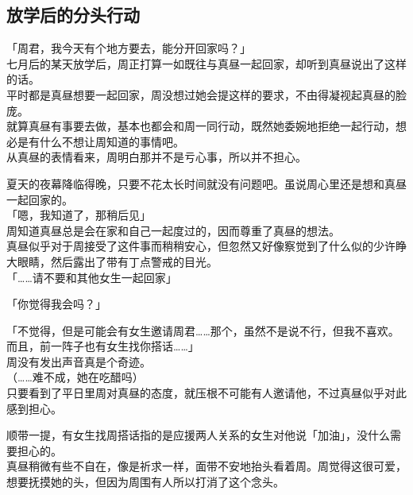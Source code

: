 \subsection{放学后的分头行动}

「周君，我今天有个地方要去，能分开回家吗？」\\

七月后的某天放学后，周正打算一如既往与真昼一起回家，却听到真昼说出了这样的话。\\

平时都是真昼想要一起回家，周没想过她会提这样的要求，不由得凝视起真昼的脸庞。\\

就算真昼有事要去做，基本也都会和周一同行动，既然她委婉地拒绝一起行动，想必是有什么不想让周知道的事情吧。\\

从真昼的表情看来，周明白那并不是亏心事，所以并不担心。

夏天的夜幕降临得晚，只要不花太长时间就没有问题吧。虽说周心里还是想和真昼一起回家的。\\

「嗯，我知道了，那稍后见」\\

周知道真昼总是会在家和自己一起度过的，因而尊重了真昼的想法。\\

真昼似乎对于周接受了这件事而稍稍安心，但忽然又好像察觉到了什么似的少许睁大眼睛，然后露出了带有丁点警戒的目光。\\

「……请不要和其他女生一起回家」

「你觉得我会吗？」

「不觉得，但是可能会有女生邀请周君……那个，虽然不是说不行，但我不喜欢。而且，前一阵子也有女生找你搭话……」\\

周没有发出声音真是个奇迹。\\

（……难不成，她在吃醋吗）\\

只要看到了平日里周对真昼的态度，就压根不可能有人邀请他，不过真昼似乎对此感到担心。

顺带一提，有女生找周搭话指的是应援两人关系的女生对他说「加油」，没什么需要担心的。\\

真昼稍微有些不自在，像是祈求一样，面带不安地抬头看着周。周觉得这很可爱，想要抚摸她的头，但因为周围有人所以打消了这个念头。\\

